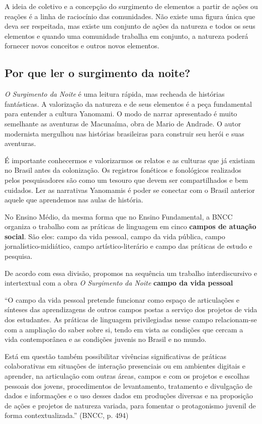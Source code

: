 \documentclass[12pt]{extarticle}
\begin{document}
A ideia de coletivo e a concepção do surgimento de elementos a partir de
ações ou reações é a linha de raciocínio das comunidades. Não existe uma
figura única que deva ser respeitada, mas existe um conjunto de ações da
natureza e todos os seus elementos e quando uma comunidade trabalha em
conjunto, a natureza poderá fornecer novos conceitos e outros novos
elementos.

\subsection{Por que ler o surgimento da noite?}

\emph{O Surgimento da Noite} é uma leitura rápida, mas recheada de
histórias fantásticas. A valorização da natureza e de seus elementos é a
peça fundamental para entender a cultura Yanomami. O modo de narrar
apresentado é muito semelhante as aventuras de Macunaíma, obra de Mario
de Andrade. O autor modernista mergulhou nas histórias brasileiras para
construir seu herói e suas aventuras.

É importante conhecermos e valorizarmos os relatos e as culturas que já
existiam no Brasil antes da colonização. Os registros fonéticos e
fonológicos realizados pelos pesquisadores são como um tesouro que devem
ser compartilhados e bem cuidados. Ler as narrativas Yanomamis é poder
se conectar com o Brasil anterior aquele que aprendemos nas aulas de
história.


No Ensino Médio, da mesma forma que no Ensino Fundamental, a BNCC
organiza o trabalho com as práticas de linguagem em cinco \textbf{campos
de atuação social}. São eles: campo da vida pessoal, campo da vida
pública, campo jornalístico-midiático, campo artístico-literário e campo
das práticas de estudo e pesquisa.

De acordo com essa divisão, propomos na sequência um trabalho
interdiscursivo e intertextual com a obra \emph{O Surgimento da Noite} \textbf{campo da vida pessoal}

``O campo da vida pessoal pretende funcionar como espaço de articulações
e sínteses das aprendizagens de outros campos postas a serviço dos
projetos de vida dos estudantes. As práticas de linguagem privilegiadas
nesse campo relacionam-se com a ampliação do saber sobre si, tendo em
vista as condições que cercam a vida contemporânea e as condições
juvenis no Brasil e no mundo.

Está em questão também possibilitar vivências significativas de práticas
colaborativas em situações de interação presenciais ou em ambientes
digitais e aprender, na articulação com outras áreas, campos e com os
projetos e escolhas pessoais dos jovens, procedimentos de levantamento,
tratamento e divulgação de dados e informações e o uso desses dados em
produções diversas e na proposição de ações e projetos de natureza
variada, para fomentar o protagonismo juvenil de forma
contextualizada.'' (BNCC, p. 494)
\end{document}
